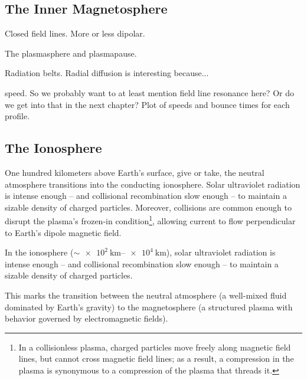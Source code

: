 \subsection{The Inner Magnetosphere}

Closed field lines. More or less dipolar. 

The plasmasphere and plasmapause. 

Radiation belts. Radial diffusion is interesting because... 

\Alfven speed. So we probably want to at least mention field line resonance here? Or do we get into that in the next chapter? Plot of \Alfven speeds and \Alfven bounce times for each profile. 

\subsection{The Ionosphere}
  \label{sec_ionos}



One hundred kilometers above Earth's surface, give or take, the neutral atmosphere transitions into the conducting ionosphere. Solar ultraviolet radiation is intense enough -- and collisional recombination slow enough -- to maintain a sizable density of charged particles. Moreover, collisions are common enough to disrupt the plasma's frozen-in condition\footnote{In a collisionless plasma, charged particles move freely along magnetic field lines, but cannot cross magnetic field lines; as a result, a compression in the plasma is synonymous to a compression of the plasma that threads it. }, allowing current to flow perpendicular to Earth's dipole magnetic field. 


In the ionosphere ($\sim\SIrange{e2}{e4}{\km}$), solar ultraviolet radiation is intense enough -- and collisional recombination slow enough -- to maintain a sizable density of charged particles. 







This marks the transition between the neutral atmosphere (a well-mixed fluid dominated by Earth's gravity) to the magnetosphere (a structured plasma with behavior governed by electromagnetic fields). 

